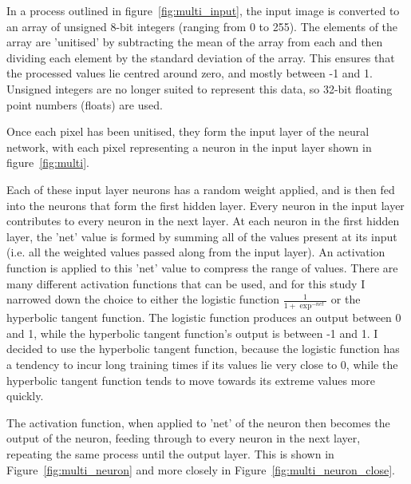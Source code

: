 
 In a process outlined in figure~\ref{fig:multi_input}, the input image is converted to an array of unsigned 8-bit integers (ranging from 0 to 255). The elements of the array are 'unitised' by subtracting the mean of the array from each and then dividing each element by the standard deviation of the array. This ensures that the processed values lie centred around zero, and mostly between -1 and 1. Unsigned integers are no longer suited to represent this data, so 32-bit floating point numbers (floats) are used.
 
 Once each pixel has been unitised, they form the input layer of the neural network, with each pixel representing a neuron in the input layer shown in figure~\ref{fig:multi}. 
 
 Each of these input layer neurons has a random weight applied, and is then fed into the neurons that form the first hidden layer. Every neuron in the input layer contributes to every neuron in the next layer. At each neuron in the first hidden layer, the 'net' value is formed by summing all of the values present at its input (i.e. all the weighted values passed along from the input layer). An activation function is applied to this 'net' value to compress the range of values. There are many different activation functions that can be used, and for this study I narrowed down the choice to either the logistic function $ \frac{1}{1 + \exp^{-net}} $ or the hyperbolic tangent function. The logistic function produces an output between 0 and 1, while the hyperbolic tangent function's output is between -1 and 1. I decided to use the hyperbolic tangent function, because the logistic function has a tendency to incur long training times if its values lie very close to 0, while the hyperbolic tangent function tends to move towards its extreme values more quickly.  
 
 The activation function, when applied to 'net' of the neuron then becomes the output of the neuron, feeding through to every neuron in the next layer, repeating the same process until the output layer. This is shown in Figure~\ref{fig:multi_neuron} and more closely in Figure~\ref{fig:multi_neuron_close}.
 
